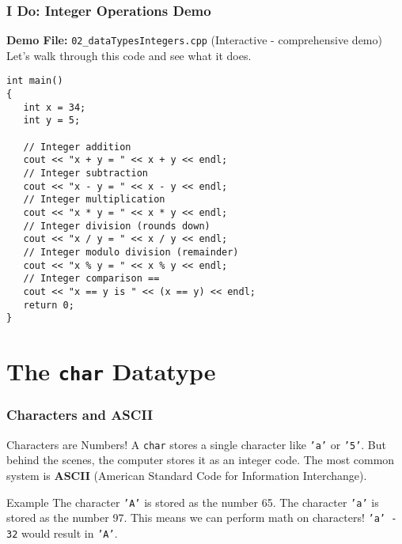\documentclass{beamer}
\begin{document}
\begin{frame}[fragile]
\frametitle{I Do: Integer Operations Demo}
\textbf{Demo File:} \texttt{02\_dataTypesIntegers.cpp} (Interactive - comprehensive demo)
\\Let's walk through this code and see what it does.\pause
\begin{verbatim}
int main()
{
   int x = 34;
   int y = 5;

   // Integer addition
   cout << "x + y = " << x + y << endl;
   // Integer subtraction
   cout << "x - y = " << x - y << endl;
   // Integer multiplication
   cout << "x * y = " << x * y << endl;
   // Integer division (rounds down)
   cout << "x / y = " << x / y << endl;
   // Integer modulo division (remainder)
   cout << "x % y = " << x % y << endl;
   // Integer comparison ==
   cout << "x == y is " << (x == y) << endl;
   return 0;
}
\end{verbatim}
\end{frame}


\section{The \texttt{char} Datatype}

\begin{frame}
\frametitle{Characters and ASCII}
\begin{alertblock}{Characters are Numbers!}
A \texttt{char} stores a single character like \texttt{'a'} or \texttt{'5'}. But behind the scenes, the computer stores it as an integer code. The most common system is \textbf{ASCII} (American Standard Code for Information Interchange).
\end{alertblock}\pause
\begin{exampleblock}{Example}
The character \texttt{'A'} is stored as the number 65.
\newline
The character \texttt{'a'} is stored as the number 97.\pause
\newline
This means we can perform math on characters! \texttt{'a' - 32} would result in \texttt{'A'}.
\end{exampleblock}
\end{frame}
\end{document}
